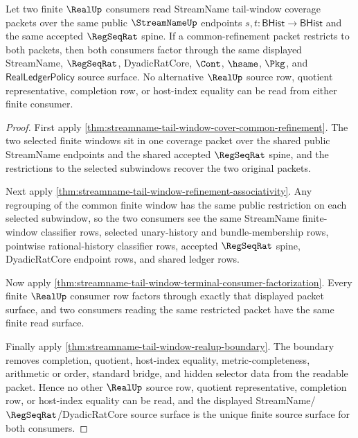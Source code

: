 \begin{theorem}
\label{thm:streamname-tail-window-terminal-source-uniqueness}
Let two finite $\RealUp$ consumers read StreamName tail-window coverage packets
over the same public $\StreamNameUp$ endpoints
$s,t:\mathsf{BHist}\to\mathsf{BHist}$ and the same accepted $\RegSeqRat$
spine. If a common-refinement packet restricts to both packets, then both
consumers factor through the same displayed StreamName, $\RegSeqRat$,
DyadicRatCore, $\Cont$, $\hsame$, $\Pkg$, and
$\mathsf{RealLedgerPolicy}$ source surface. No alternative $\RealUp$ source
row, quotient representative, completion row, or host-index equality can be
read from either finite consumer.
\end{theorem}
\begin{proof}
First apply \autoref{thm:streamname-tail-window-cover-common-refinement}.
The two selected finite windows sit in one coverage packet over the shared
public StreamName endpoints and the shared accepted $\RegSeqRat$ spine, and
the restrictions to the selected subwindows recover the two original packets.

Next apply \autoref{thm:streamname-tail-window-refinement-associativity}.
Any regrouping of the common finite window has the same public restriction on
each selected subwindow, so the two consumers see the same StreamName
finite-window classifier rows, selected unary-history and bundle-membership
rows, pointwise rational-history classifier rows, accepted $\RegSeqRat$
spine, DyadicRatCore endpoint rows, and shared ledger rows.

Now apply
\autoref{thm:streamname-tail-window-terminal-consumer-factorization}. Every
finite $\RealUp$ consumer row factors through exactly that displayed packet
surface, and two consumers reading the same restricted packet have the same
finite read surface.

Finally apply \autoref{thm:streamname-tail-window-realup-boundary}. The
boundary removes completion, quotient, host-index equality,
metric-completeness, arithmetic or order, standard bridge, and hidden
selector data from the readable packet. Hence no other $\RealUp$ source row,
quotient representative, completion row, or host-index equality can be read,
and the displayed StreamName/$\RegSeqRat$/DyadicRatCore source surface is the
unique finite source surface for both consumers.
\end{proof}

